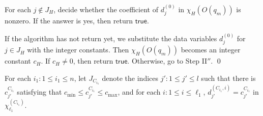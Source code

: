 \documentclass[runningheads,a4paper]{llncs}
\newcommand\ltrue{\mathsf{true}}
\begin{document}
\begin{appendix}
For each $j \not \in J_H$, decide whether the coefficient of $d^{(0)}_j$ in $\chi_H(O(q_m))$ is nonzero. If the answer is yes, then return $\ltrue$. 

If the algorithm has not return yet, we substitute the data variables $d^{(0)}_j$ for $j \in J_H$ with the integer constants. Then $\chi_H(O(q_m))$ becomes an integer constant $c_H$. If $c_H \neq 0$, then return $\ltrue$.  Otherwise, go to Step II$''$. \qed

\medskip

For each $i_1: 1 \le i_1 \le n$, let $J_{C_{i_1}}$ denote the indices $j': 1 \le j' \le l$ such that there is $c^{C_{i_1}}_{j'}$ satisfying that $c_{\min} \le c^{C_{i_1}}_{j'} \le c_{\max}$, and for each $i: 1 \le i \le \ell_1$, $d^{(C_{i_1},i)}_{j'}=c^{C_{i_1}}_{j'}$ in $\chi^{(C_{i_1})}_{\ell_1}$. 


\end{appendix}
\end{document}
